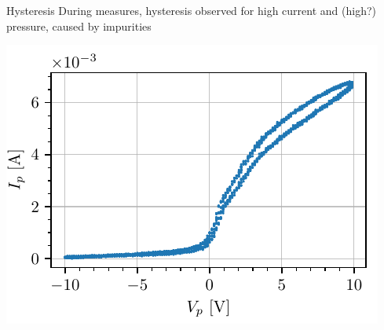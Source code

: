\documentclass[10pt]{beamer}
\begin{document}
\begin{frame}{Hysteresis}
    During measures,
    hysteresis observed for high current and (high?) pressure, caused by impurities
    \begin{center}
        \includegraphics[scale=1]{../figures/hysteresis.pdf}
    \end{center}

\end{frame}
\end{document}
